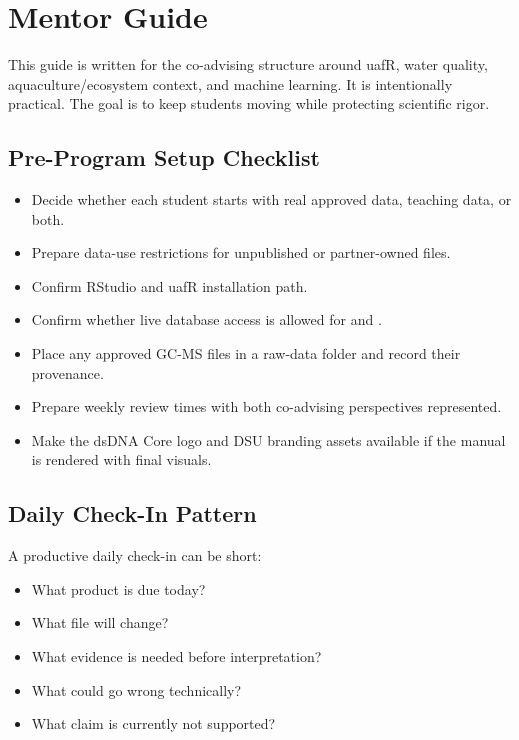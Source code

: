 \chapter{Mentor Guide}

This guide is written for the co-advising structure around uafR, water quality, aquaculture/ecosystem context, and machine learning. It is intentionally practical. The goal is to keep students moving while protecting scientific rigor.

\section{Pre-Program Setup Checklist}

\begin{itemize}
  \item Decide whether each student starts with real approved data, teaching data, or both.
  \item Prepare data-use restrictions for unpublished or partner-owned files.
  \item Confirm RStudio and uafR installation path.
  \item Confirm whether live database access is allowed for  and .
  \item Place any approved GC-MS files in a raw-data folder and record their provenance.
  \item Prepare weekly review times with both co-advising perspectives represented.
  \item Make the dsDNA Core logo and DSU branding assets available if the manual is rendered with final visuals.
\end{itemize}

\section{Daily Check-In Pattern}

A productive daily check-in can be short:
\begin{itemize}
  \item What product is due today?
  \item What file will change?
  \item What evidence is needed before interpretation?
  \item What could go wrong technically?
  \item What claim is currently not supported?
\end{itemize}


